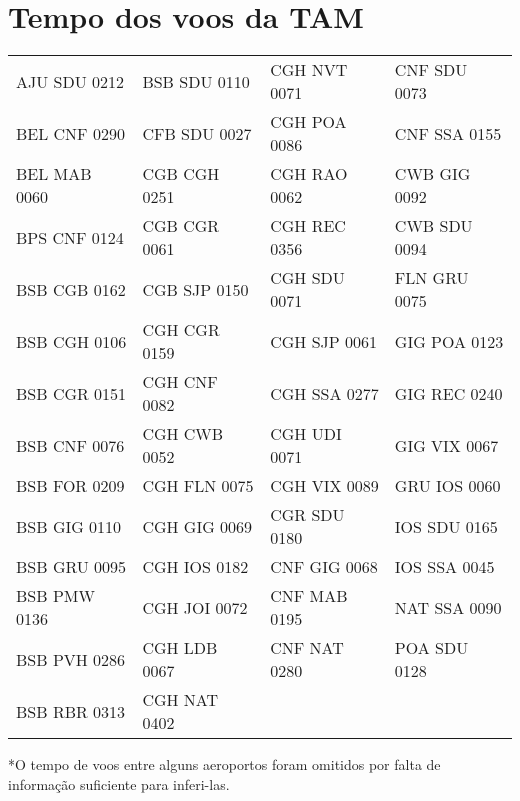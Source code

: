 \chapter{Tempo dos voos da TAM}\label{anx:timetam}


\begin{scriptsize}

\begin{longtable}{l l l l}



AJU SDU 0212 & BSB SDU 0110 & CGH NVT 0071 & CNF SDU 0073 \\
BEL CNF 0290 & CFB SDU 0027 & CGH POA 0086 & CNF SSA 0155 \\
BEL MAB 0060 & CGB CGH 0251 & CGH RAO 0062 & CWB GIG 0092 \\
BPS CNF 0124 & CGB CGR 0061 & CGH REC 0356 & CWB SDU 0094 \\
BSB CGB 0162 & CGB SJP 0150 & CGH SDU 0071 & FLN GRU 0075 \\
BSB CGH 0106 & CGH CGR 0159 & CGH SJP 0061 & GIG POA 0123 \\
BSB CGR 0151 & CGH CNF 0082 & CGH SSA 0277 & GIG REC 0240 \\
BSB CNF 0076 & CGH CWB 0052 & CGH UDI 0071 & GIG VIX 0067 \\
BSB FOR 0209 & CGH FLN 0075 & CGH VIX 0089 & GRU IOS 0060 \\
BSB GIG 0110 & CGH GIG 0069 & CGR SDU 0180 & IOS SDU 0165 \\
BSB GRU 0095 & CGH IOS 0182 & CNF GIG 0068 & IOS SSA 0045 \\
BSB PMW 0136 & CGH JOI 0072 & CNF MAB 0195 & NAT SSA 0090 \\
BSB PVH 0286 & CGH LDB 0067 & CNF NAT 0280 & POA SDU 0128 \\
BSB RBR 0313 & CGH NAT 0402 & & \\


\end{longtable}

*O tempo de voos entre alguns aeroportos foram omitidos por falta de informação suficiente para inferi-las.
\end{scriptsize}